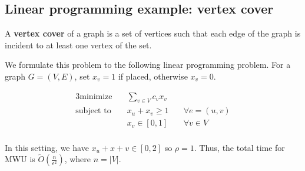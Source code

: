 \documentclass[11pt]{article}
\begin{document}
\subsection{Linear programming example: vertex cover}
A \textbf{vertex cover} of a graph is a set of vertices such that each edge of the graph is incident to at least one vertex of the set.

We formulate this problem to the following linear programming problem.
For a graph $G = (V, E)$, set $x_v = 1$ if placed, otherwise $x_v = 0$.

\begin{alignat*}{3}
\text{minimize} \quad   & \sum_{v \in V} c_v x_v & \\
\text{subject to} \quad & x_u + x_v \geq 1 \quad & \forall e=(u, v) \\
& x_v \in [0, 1] & \forall v \in V \\
\end{alignat*}

In this setting, we have $x_u + x+v \in [0, 2]$ so $\rho = 1$.
Thus, the total time for MWU is $\tilde{O}(\frac{n}{\epsilon^2})$, where $n = |V|$.
\end{document}
